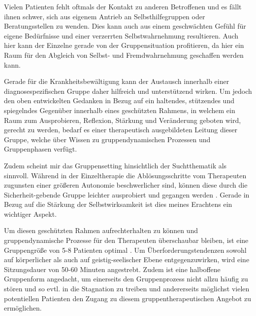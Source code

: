 Vielen Patienten fehlt oftmals der Kontakt zu anderen Betroffenen und es fällt ihnen schwer, sich aus eigenem Antrieb an Selbsthilfegruppen oder Beratungsstellen zu wenden. Dies kann auch aus einem geschwächten Gefühl für eigene Bedürfnisse und einer verzerrten Selbstwahrnehmung resultieren. Auch hier kann der Einzelne gerade von der Gruppensituation profitieren, da hier ein Raum für den Abgleich von Selbst- und Fremdwahrnehmung geschaffen werden kann.

Gerade für die Krankheitsbewältigung kann der Austausch innerhalb einer diagnosespezifischen Gruppe daher hilfreich und unterstützend wirken. Um jedoch den oben entwickelten Gedanken in Bezug auf ein haltendes, stützendes und spiegelndes Gegenüber innerhalb eines geschützten Rahmens, in welchem ein Raum zum Ausprobieren, Reflexion, Stärkung und Veränderung geboten wird, gerecht zu werden, bedarf es einer therapeutisch ausgebildeten Leitung dieser Gruppe, welche über Wissen zu gruppendynamischen Prozessen und Gruppenphasen verfügt. 

Zudem scheint mir das Gruppensetting hinsichtlich der Suchtthematik als sinnvoll. Während in der Einzeltherapie die Ablösungsschritte vom Therapeuten zugunsten einer größeren Autonomie beschwerlicher sind, können diese durch die Sicherheit-gebende Gruppe leichter ausprobiert und gegangen werden \autocite[vgl.]{nawe2014}. Gerade in Bezug auf die Stärkung der Selbstwirksamkeit ist dies meines Erachtens ein wichtiger Aspekt.

Um diesen geschützten Rahmen aufrechterhalten zu können und gruppendynamische Prozesse für den Therapeuten überschaubar bleiben, ist eine Gruppengröße von 5-8 Patienten optimal \autocite[vgl.[]{weber2013}. Um Überforderungstendenzen sowohl auf körperlicher als auch auf geistig-seelischer Ebene entgegenzuwirken, wird eine Sitzungsdauer von 50-60 Minuten angestrebt. Zudem ist eine halboffene Gruppenform angedacht, um einerseits den Gruppenprozess nicht allzu häufig zu stören und so evtl. in die Stagnation zu treiben und andererseits möglichst vielen potentiellen Patienten den Zugang zu diesem gruppentherapeutischen Angebot zu ermöglichen. 

